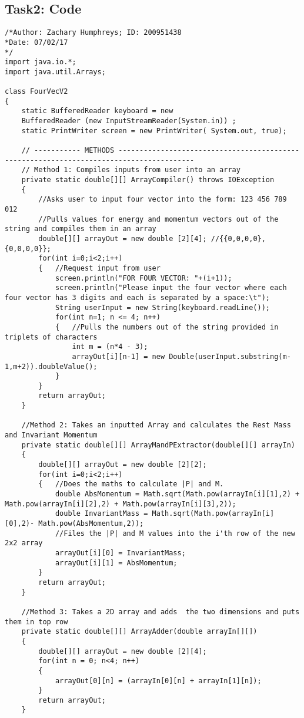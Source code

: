 \documentclass{article}
\begin{document}
\subsection{Task2: Code}
\begin{lstlisting}
/*Author: Zachary Humphreys; ID: 200951438
*Date: 07/02/17
*/
import java.io.*;
import java.util.Arrays;

class FourVecV2
{
	static BufferedReader keyboard = new
	BufferedReader (new InputStreamReader(System.in)) ;
	static PrintWriter screen = new PrintWriter( System.out, true);
	
	// ----------- METHODS ----------------------------------------------------------------------------------------
	// Method 1: Compiles inputs from user into an array
	private static double[][] ArrayCompiler() throws IOException
	{
		//Asks user to input four vector into the form: 123 456 789 012
		//Pulls values for energy and momentum vectors out of the string and compiles them in an array
		double[][] arrayOut = new double [2][4]; //{{0,0,0,0},{0,0,0,0}};
		for(int i=0;i<2;i++)
		{   //Request input from user
			screen.println("FOR FOUR VECTOR: "+(i+1));
			screen.println("Please input the four vector where each four vector has 3 digits and each is separated by a space:\t");
			String userInput = new String(keyboard.readLine());
			for(int n=1; n <= 4; n++)
			{   //Pulls the numbers out of the string provided in triplets of characters
				int m = (n*4 - 3);
				arrayOut[i][n-1] = new Double(userInput.substring(m-1,m+2)).doubleValue();
			}
		}
		return arrayOut;
	}
	
	//Method 2: Takes an inputted Array and calculates the Rest Mass and Invariant Momentum
	private static double[][] ArrayMandPExtractor(double[][] arrayIn)
	{
		double[][] arrayOut = new double [2][2];
		for(int i=0;i<2;i++)
		{   //Does the maths to calculate |P| and M.
			double AbsMomentum = Math.sqrt(Math.pow(arrayIn[i][1],2) + Math.pow(arrayIn[i][2],2) + Math.pow(arrayIn[i][3],2));
			double InvariantMass = Math.sqrt(Math.pow(arrayIn[i][0],2)- Math.pow(AbsMomentum,2));
			//Files the |P| and M values into the i'th row of the new 2x2 array
			arrayOut[i][0] = InvariantMass;
			arrayOut[i][1] = AbsMomentum;
		}
		return arrayOut;
	}
	
	//Method 3: Takes a 2D array and adds  the two dimensions and puts them in top row
	private static double[][] ArrayAdder(double arrayIn[][])
	{   
		double[][] arrayOut = new double [2][4];
		for(int n = 0; n<4; n++)
		{
			arrayOut[0][n] = (arrayIn[0][n] + arrayIn[1][n]);
		}
		return arrayOut;
	}
	

\end{lstlisting}
\end{document}

